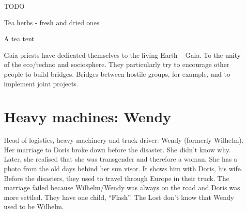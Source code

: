 \begin{npcBox}[title=Laura, Gaianistin]
    \begin{stunts}
    \item {}
    \end{stunts}

    \begin{stressSection}
    \end{stressSection}
    \begin{tabularx}{\textwidth}{ XX }
    \end{tabularx}

    \begin{consequences}
    \item {}
    \item {}
    \item {}
    \end{consequences}

    \begin{npcDescription}
    TODO
    \end{npcDescription}


    \begin{equipment}
    \item Tea herbs - fresh and dried ones
    \item A tea tent
    \end{equipment}
\end{npcBox}


Gaia priests have dedicated themselves to the living Earth – Gaia. To the unity of the eco/techno and sociosphere. They particularly try to encourage other people to build bridges. Bridges between hostile groups, for example, and to implement joint projects.

\newpage


\section{Heavy machines: Wendy}

Head of logistics, heavy machinery and truck driver: Wendy (formerly Wilhelm). Her marriage to Doris broke down before the disaster. She didn't know why. Later, she realised that she was transgender and therefore a woman. She has a photo from the old days behind her sun visor. It shows him with Doris, his wife. Before the disasters, they used to travel through Europe in their truck. The marriage failed because Wilhelm/Wendy was always on the road and Doris was more settled. They have one child, “Flash”. The Lost don't know that Wendy used to be Wilhelm.

